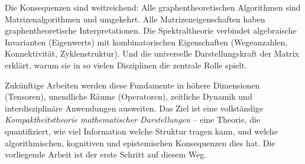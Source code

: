 ﻿\documentclass[12pt, a4paper]{article}
\theoremstyle{definition}
\theoremstyle{remark}
\begin{document}
Die Konsequenzen sind weitreichend: Alle graphentheoretischen Algorithmen
sind Matrizenalgorithmen und umgekehrt. Alle Matrizeneigenschaften haben
graphentheoretische Interpretationen. Die Spektraltheorie verbindet
algebraische Invarianten (Eigenwerte) mit kombinatorischen Eigenschaften
(Wegeanzahlen, Konnektivität, Zyklenstruktur). Und die universelle
Darstellungskraft der Matrix erklärt, warum sie in so vielen Disziplinen
die zentrale Rolle spielt.

Zukünftige Arbeiten werden diese Fundamente in höhere Dimensionen
(Tensoren), unendliche Räume (Operatoren), zeitliche Dynamik und
interdisziplinäre Anwendungen ausweiten. Das Ziel ist eine vollständige
\emph{Kompaktheitstheorie mathematischer Darstellungen} -- eine Theorie,
die quantifiziert, wie viel Information welche Struktur tragen kann, und
welche algorithmischen, kognitiven und epistemischen Konsequenzen dies
hat. Die vorliegende Arbeit ist der erste Schritt auf diesem Weg.
\end{document}
